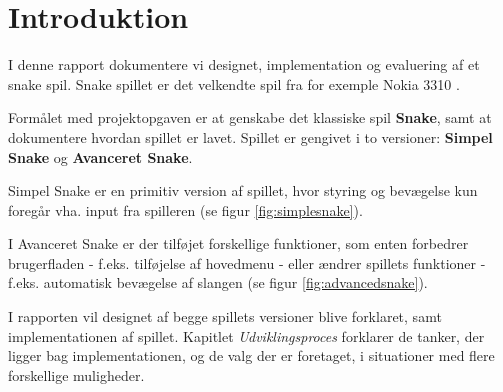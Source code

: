 \section{Introduktion}
I denne rapport dokumentere vi designet, implementation og evaluering af et snake spil. Snake spillet er det velkendte spil fra for exemple Nokia 3310 \cite{wiki_snake}. 

Formålet med projektopgaven er at genskabe det klassiske spil \textbf{Snake}, samt at dokumentere hvordan spillet er lavet.
Spillet er gengivet i to versioner: \textbf{Simpel Snake} og \textbf{Avanceret Snake}. 

Simpel Snake er en primitiv version af spillet, hvor styring og bevægelse kun foregår vha. input fra spilleren (se figur \ref{fig:simplesnake}). 

I Avanceret Snake er der tilføjet forskellige funktioner, som enten forbedrer brugerfladen - f.eks. tilføjelse af hovedmenu - eller ændrer spillets funktioner - f.eks. automatisk bevægelse af slangen (se figur \ref{fig:advancedsnake}).

I rapporten vil designet af begge spillets versioner blive forklaret, samt implementationen af spillet. Kapitlet \textit{Udviklingsproces} forklarer de tanker, der ligger bag implementationen, og de valg der er foretaget, i situationer med flere forskellige muligheder.

\begin{figure}[b]
	\centering
	\graphicspath{ {pics/} }
	\hspace{0.1\textwidth}
	\caption{}
\end{figure}